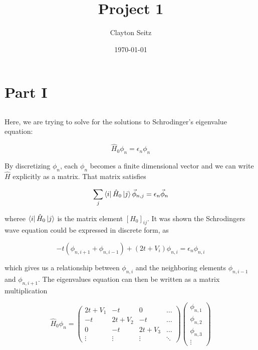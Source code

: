 \documentclass[%
 reprint,
 amsmath,amssymb,
 aps,
]{revtex4-2}
\begin{document}
\title{Project 1}%

\author{Clayton Seitz}

\date{\today}%


\maketitle


\section{Part I}

\subsection{}


Here, we are trying to solve for the solutions to Schrodinger's eigenvalue equation:

\begin{equation*}
\hat{H}_{0}\phi_{n} = \epsilon_{n}\phi_{n}
\end{equation*}

By discretizing $\phi_{n}$, each $\phi_{n}$ becomes a finite dimensional vector and we can write $\hat{H}$ explicitly as a matrix. That matrix satisfies

\begin{equation*}
\sum_{j}\bra{i}\hat{H}_{0}\ket{j}\vec{\phi}_{n,j} = \epsilon_{n}\vec{\phi}_{n}
\end{equation*}

wheree $\bra{i}\hat{H}_{0}\ket{j}$ is the matrix element $[H_{0}]_{ij}$. It was shown the Schrodingers wave equation could be expressed in discrete form, as

\begin{equation*}
-t(\phi_{n,i+1} + \phi_{n,i-1}) + (2t+V_{i})\phi_{n,i} = \epsilon_{n}\phi_{n,i}
\end{equation*}

which gives us a relationship between $\phi_{n,i}$ and the neighboring elements $\phi_{n,i-1}$ and $\phi_{n,i+1}$. The eigenvalues equation can then be written as a matrix multiplication

\begin{equation}
\hat{H}_{0}\phi_{n} = \begin{pmatrix}
2t + V_{1} & -t & 0 & \hdots\\
-t & 2t + V_{2} & -t& \hdots\\
0 & -t & 2t + V_{3}& \hdots\\
\vdots & \vdots & \vdots & \ddots
\end{pmatrix}
\begin{pmatrix}
\phi_{n,1}\\
\phi_{n,2}\\
\phi_{n,3}\\
\vdots
\end{pmatrix}
\end{equation}
\end{document}
